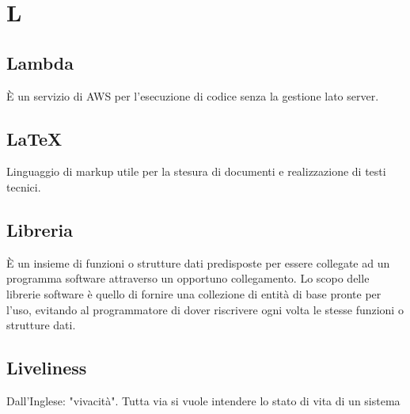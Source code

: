 \section*{L}

\subsection{Lambda}
È un servizio di AWS per l'esecuzione di codice senza la gestione lato server.

\subsection{LaTeX}
Linguaggio di markup utile per la stesura di documenti e realizzazione di testi tecnici. 

\subsection{Libreria}
È un insieme di funzioni o strutture dati predisposte per essere collegate ad un programma software attraverso un opportuno collegamento.
Lo scopo delle librerie software è quello di fornire una collezione di entità di base pronte per l'uso, evitando al programmatore di dover riscrivere ogni volta le stesse funzioni o strutture dati.

\subsection{Liveliness}
Dall'Inglese: "vivacità". Tutta via si vuole intendere lo stato di vita di un sistema